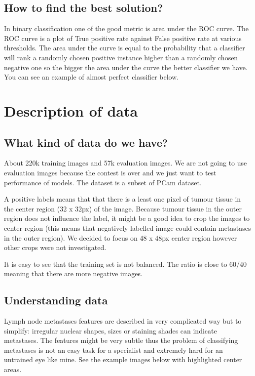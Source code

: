 \documentclass[12pt, a4paper]{article}
\begin{document}
\subsection*{How to find the best solution?}

\noindent
In binary classification one of the good metric is area under the ROC curve. The ROC curve is a plot of True positive rate against False positive rate at various thresholds. The area under the curve is equal to the probability that a classifier will rank a randomly chosen positive instance higher than a randomly chosen negative one so the bigger the area under the curve the better classifier we have. You can see an example of almost perfect classifier below.

\section{Description of data}

\subsection*{What kind of data do we have?}

\noindent
About 220k training images and 57k evaluation images.  We are not going to use evaluation images because the contest is over and we just want to test performance of models. The dataset is a subset of PCam dataset. 

\noindent
A positive labels means that that there is a least one pixel of tumour tissue in the center region (32 x 32px) of the image. Because tumour tissue in the outer region does not influence the label, it might be a good idea to crop the images to center region (this means that negatively labelled image could contain metastases in the outer region). We decided to focus on 48 x 48px center region however other crops were not investigated.

\noindent
It is easy to see that the training set is not balanced. The ratio is close to 60/40 meaning that there are more negative images.

\subsection*{Understanding data}

\noindent
Lymph node metastases features are described in very complicated way but to simplify: irregular nuclear shapes, sizes or staining shades can indicate metastases. The features might be very subtle thus the problem of classifying metastases is not an easy task for a specialist and extremely hard for an untrained eye like mine. See the example images below with highlighted center areas.
\end{document}
